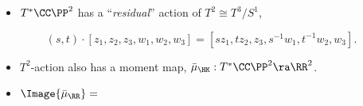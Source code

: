 \begin{frame}
    \begin{itemize}
        \item $T^{\ast}\CC\PP^{2}$ has a ``\emph{residual}'' action of $T^{2} \cong T^{3}/S^{1}$,
    \end{itemize}
    \[
        (s,t)\cdot [z_{1},z_{2},z_{3}, w_{1}, w_{2}, w_{3}] = [sz_{1},tz_{2},z_{3}, s^{-1}w_{1}, t^{-1}w_{2}, w_{3}].    
    \]
    \begin{itemize}
        \item $T^{2}$-action also has a moment map, $\bar{\mu}_{\HK} : T^{\ast}\CC\PP^{2} \ra \RR^{2}$.
    \end{itemize}

    \begin{itemize}
        \item $\Image{\bar{\mu}_{\RR}} =$
    \end{itemize}
\end{frame}